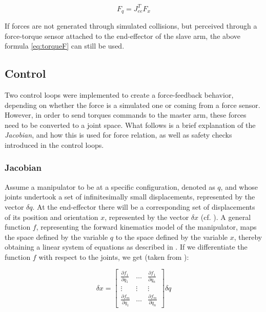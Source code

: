 \documentclass[runningheads]{llncs}
\begin{document}
\begin{equation}
	F_q = J_{ee}^T  F_{x}
	\label{eq:torqueF}
\end{equation}

If forces are not generated through simulated collisions, but perceived through a force-torque sensor attached to the end-effector of the slave arm, the above formula \eqref{eq:torqueF} can still be used.


\subsection{Control}

Two control loops were implemented to create a force-feedback behavior, depending on whether the force is a simulated one or coming from a force sensor. However, in order to send torques commands to the master arm, these forces need to be converted to a joint space. What follows is a brief explanation of the \textit{Jacobian}, and how this is used for force relation, as well as safety checks introduced in the control loops.

\subsubsection{Jacobian}

Assume a manipulator to be at a specific configuration, denoted as $q$, and whose joints undertook a set of infinitesimally small displacements, represented by the vector $\delta q$. At the end-effector there will be a corresponding set of displacements of its position and orientation $x$, represented by the vector $\delta x$ (cf. \cite{itr}). A general function $f$, representing the forward kinematics model of the manipulator, maps the space defined by the variable $q$ to the space defined by the variable $x$, thereby obtaining a linear system of equations as described in \cite{itr}. If we differentiate the function $f$ with respect to the joints, we get (taken from \cite{itr}):

\begin{equation}
\delta x = \begin{bmatrix}
\frac{\partial f_{1}}{\partial q_{1}} & \ldots & \frac{\partial f_{1}}{\partial q_{n}} \\
\vdots & \vdots & \vdots \\
\frac{\partial f_{m}}{\partial q_{1}} & \ldots & \frac{\partial f_{m}}{\partial q_{n}}
\end{bmatrix} \delta q
\end{equation}
\end{document}
